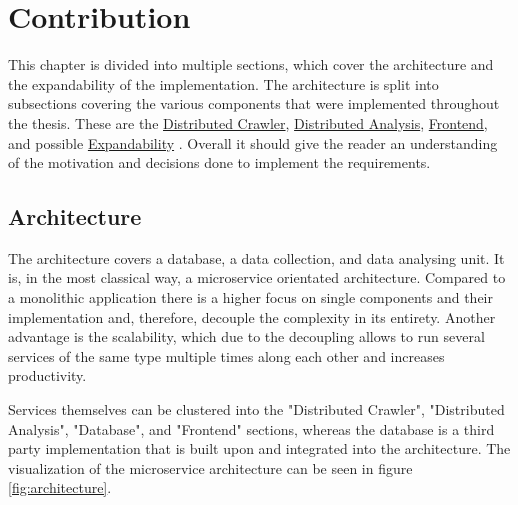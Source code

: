 \chapter{Contribution}
\label{sec:contribution}

This chapter is divided into multiple sections, which cover the architecture and the expandability of the implementation. The architecture is split into subsections covering the various components that were implemented throughout the thesis. These are the \hyperref[sec:crawler]{Distributed Crawler}, \hyperref[sec:distributed_analysis]{Distributed Analysis}, \hyperref[sec:fronted]{Frontend}, and possible \hyperref[sec:expandability]{Expandability} . Overall it should give the reader an understanding of the motivation and decisions done to implement the requirements.


\section{Architecture}
\label{sec:architecture}

The architecture covers a database, a data collection, and data analysing unit. It is, in the most classical way, a microservice orientated architecture. Compared to a monolithic application there is a higher focus on single components and their implementation and, therefore, decouple the complexity in its entirety. Another advantage is the scalability, which due to the decoupling allows to run several services of the same type multiple times along each other and increases productivity.

Services themselves can be clustered into the "Distributed Crawler", "Distributed Analysis", "Database", and "Frontend" sections, whereas the database is a third party implementation that is built upon and integrated into the architecture. The visualization of the microservice architecture can be seen in figure \ref{fig:architecture}.

